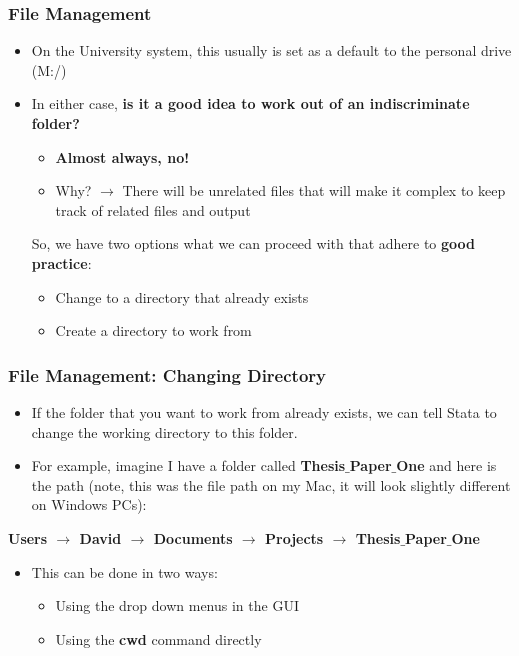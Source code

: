 \documentclass[10pt, compress]{beamer}
\begin{document}
\begin{frame}[fragile]
\frametitle{File Management}
\begin{itemize}
\item On the University system, this usually is set as a default to the personal drive (M:/)
\item In either case, \textbf{is it a good idea to work out of an indiscriminate folder?}
\begin{itemize}
\item \textbf{Almost always, no!}
\item Why? $\to$ There will be unrelated files that will make it complex to keep track of related files and output
\end{itemize}
So, we have two options what we can proceed with that adhere to \textbf{good practice}:
\begin{itemize}
\item \alert{Change} to a directory that already exists
\item \alert{Create} a directory to work from
\end{itemize}
\end{itemize}
\end{frame}

\begin{frame}[fragile]
\frametitle{File Management: Changing Directory}
\begin{itemize}
\item If the folder that you want to work from \alert{already exists}, we can tell Stata to change the working directory to this folder.
\item For example, imagine I have a folder called \textbf{Thesis$\_$Paper$\_$One} and here is the path (note, this was the file path on my Mac, it will look slightly different on Windows PCs):
\end{itemize}
\begin{center}
\textbf{Users $\to$ David $\to$ Documents $\to$ Projects $\to$ Thesis$\_$Paper$\_$One}
\end{center}
\begin{itemize}
\item This can be done in two ways:
\begin{itemize}
\item Using the drop down menus in the GUI
\item Using the \textbf{cwd} command directly
\end{itemize}
\end{itemize}
\end{frame}
\end{document}
